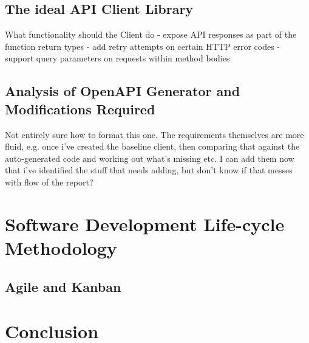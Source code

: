 \subsection{The ideal API Client Library}

What functionality should the Client do
- expose API responses as part of the function return types
- add retry attempts on certain HTTP error codes
- support query parameters on requests within method bodies 

\subsection{Analysis of OpenAPI Generator and Modifications Required}

Not entirely sure how to format this one. The requirements themselves are more fluid, e.g. once i've created the baseline client, then comparing that against the auto-generated code and working out what's missing etc. I can add them now that i've identified the stuff that needs adding, but don't know if that messes with flow of the report? 

\section{Software Development Life-cycle Methodology}
\subsection{Agile and Kanban}

\section{Conclusion}